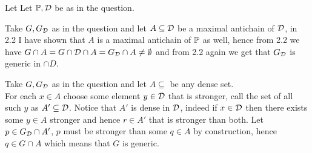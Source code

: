 \begin{cExercise}[][][author][4]
Let Let $\P,\cal D$ be as in the question.
	\begin{cPart}
		Take $G,G_{\cal D}$ as in the question and let $A\subseteq \cal D$ be a maximal antichain of $\cal D$, in 2.2 I have shown that $A$ is a maximal antichain of $\P$ as well, hence from 2.2 we have $G\cap A=G\cap \cal D\cap A=G_{\cal D}\cap A\ne\emptyset$ and from 2.2 again we get that $G_\cal{D}$ is generic in $\cap D$.
	\end{cPart}
	\begin{cPart}
		Take $G,G_{\cal D}$ as in the question and let $A\subseteq$ be any dense set.\\
		For each $x\in A$ choose some element $y\in\cal D$ that is stronger, call the set of all such $y$ as $A'\subseteq \cal D$. Notice that $A'$ is dense in $\cal D$, indeed if $x\in \cal D$ then there exists some $y\in A$ stronger and hence $r\in A'$ that is stronger than both. Let $p\in G_\cal{D}\cap A'$, $p$ must be stronger than some $q\in A$ by construction, hence $q\in G\cap A$ which means that $G$ is generic.
	\end{cPart}
\end{cExercise}





